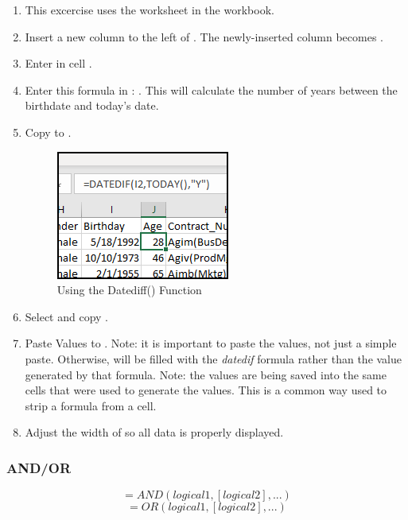 \begin{enumerate}
	\item This excercise uses the  worksheet in the  workbook.
	\item Insert a new column to the left of . The newly-inserted column becomes .
	\item Enter  in cell .
	\item Enter this formula in : . This will calculate the number of years between the birthdate and today's date. 
	\item Copy  to .
	
	\begin{figure}[H]
		\centering
		\includegraphics[width=\maxwidth{.95\linewidth}]{gfx/ch09_fig46}
		\caption{Using the Datediff() Function}
		\label{09:fig46}
	\end{figure}
	
	\item Select and copy .
	\item Paste Values to . Note: it is important to paste the values, not just a simple paste. Otherwise,  will be filled with the \textit{datedif} formula rather than the value generated by that formula. Note: the values are being saved into the same cells that were used to generate the values. This is a common way used to strip a formula from a cell.
	\item Adjust the width of  so all data is properly displayed.
\end{enumerate}

\subsubsection{AND/OR}

\[ =AND(logical1, [logical2], ...) \]
\[ =OR(logical1, [logical2], ...) \]

